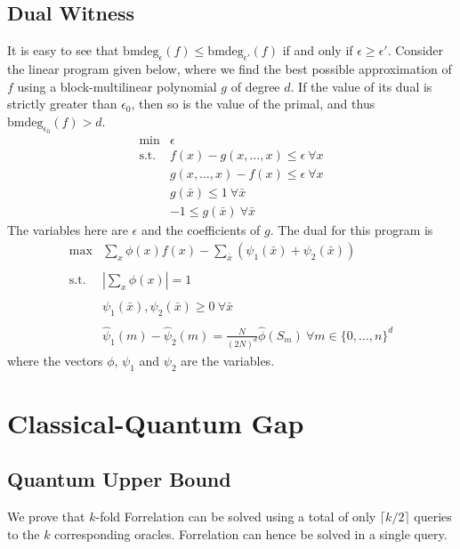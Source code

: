 \documentclass[12pt]{report}
\newcommand{\bmdeg}{\mathrm{bmdeg}}
\begin{document}
\section{Dual Witness}
It is easy to see that $\bmdeg_\epsilon(f) \leq \bmdeg_{\epsilon'}(f)$ if and only if $\epsilon \geq \epsilon'$. Consider the linear program given below, where we find the best possible approximation of $f$ using a block-multilinear polynomial $g$ of degree $d$. If the value of its dual is strictly greater than $\epsilon_0$, then so is the value of the primal, and thus $\bmdeg_{\epsilon_0}(f) > d$.
\[
\begin{array}{cc}
    \text{min} & \epsilon \\
    \text{s.t.} & f(x) - g(x, \ldots, x) \leq \epsilon\ \forall x\\
    & g(x, \ldots, x) - f(x) \leq \epsilon\ \forall x\\
    & g(\bar{x}) \leq 1\ \forall \bar{x}\\
    & -1 \leq g(\bar{x})\ \forall \bar{x}
\end{array}
\]
The variables here are $\epsilon$ and the coefficients of $g$. The dual for this program is
\[
\begin{array}{cc}
    \text{max} & \sum_x \phi(x)f(x) - \sum_{\bar{x}} (\psi_1(\bar{x}) + \psi_2(\bar{x})) \\
    & \\
    \text{s.t.} & \left|\sum_x \phi(x)\right| = 1 \\
    & \\
    & \psi_1(\bar{x}), \psi_2(\bar{x}) \geq 0\ \forall \bar{x} \\
    & \\
    & {\hat{\psi}}_1(m) - {\hat{\psi}}_2(m) = \frac{N}{(2N)^d} \hat{\phi}(S_m)\ \forall m\in \{0, \ldots, n\}^d
\end{array}
\]
where the vectors $\phi$, $\psi_1$ and $\psi_2$ are the variables.







\chapter{Classical-Quantum Gap}

\section{Quantum Upper Bound}
We prove that $k$-fold Forrelation can be solved using a total of only $\lceil k/2 \rceil$ queries to the $k$ corresponding oracles. Forrelation can hence be solved in a single query.
\end{document}
